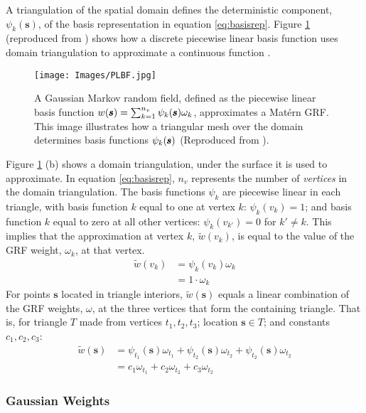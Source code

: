 A triangulation of the spatial domain defines the deterministic component, $\psi_{k}(\pmb{s})$, of the basis representation in equation \ref{eq:basisrep}. Figure \ref{fig:basis} (reproduced from \cite{Simpson2012}) shows how a discrete piecewise linear basis function uses domain triangulation to approximate a continuous function .
  \begin{figure}[H]
	\centering
	\texttt{[image: Images/PLBF.jpg]}
	\caption{A Gaussian Markov random field, defined as the piecewise linear basis function $w(\pmb{s}) = \sum_{k=1}^{n_{v}} \protect\psi_{k}(\pmb{s})\protect\omega_{k}$, approximates a Mat\'ern GRF. This image illustrates how a triangular mesh over the domain determines basis functions $\protect\psi_{k}(\pmb{s})$ (Reproduced from \cite{Simpson2012}).}
	\label{fig:basis}
	\end{figure}
Figure \ref{fig:basis} (b) shows a domain triangulation, under the surface it is used to approximate. In equation \ref{eq:basisrep}, $n_{v}$ represents the number of {\it vertices} in the domain triangulation. The basis functions $\psi_{k}$ are piecewise linear in each triangle, with basis function $k$ equal to one at vertex $k$: $\psi_{k}(v_{k}) = 1$; and basis function $k$ equal to zero at all other vertices: $\psi_{k}(v_{k'}) = 0$ for $k'\neq k$. This implies that the approximation at vertex $k$, $\widetilde{w}(v_{k})$,  is equal to the value of the GRF weight, $\omega_{k}$, at that vertex.
\begin{align}
\widetilde{w}(v_{k}) &= \psi_{k}(v_{k}) \omega_{k} \nonumber \\
&= 1 \cdot \omega_{k} \nonumber
\end{align}
For points $\pmb{s}$ located in triangle interiors, $\widetilde{w}(\pmb{s})$ equals a linear combination of the GRF weights, $\omega$, at the three vertices that form the containing triangle. That is, for triangle $T$ made from vertices $t_{1}, t_{2}, t_{3}$; location $\pmb{s} \in T$; and constants $c_{1}, c_{2}, c_{3}$:
\begin{align}
\widetilde{w}(\pmb{s}) &= \psi_{t_{1}}(\pmb{s})\omega_{t_{1}} + \psi_{t_{2}}(\pmb{s})\omega_{t_{2}} 
+ \psi_{t_{2}}(\pmb{s})\omega_{t_{2}} \nonumber \\
&= c_{1}\omega_{t_{1}} + c_{2}\omega_{t_{2}} 
+ c_{3}\omega_{t_{2}} \nonumber
\end{align}

\subsubsection{Gaussian Weights} %

